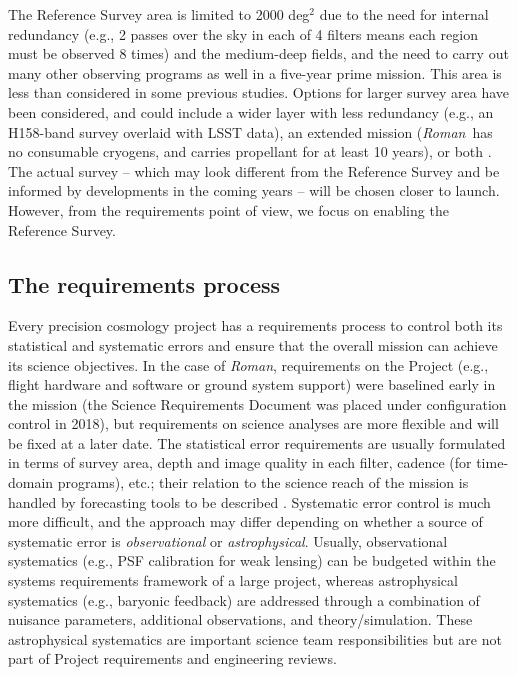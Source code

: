 \documentclass[usenatbib]{mnras}
\newcommand{\wfirst}{{\slshape Roman}}
\newcommand{\changetext}[1]{\textcolor{brown}{#1}}
\begin{document}
The Reference Survey area is limited to 2000 deg$^2$ due to the need for internal redundancy (e.g., 2 passes over the sky in each of 4 filters means each region must be observed 8 times) and the medium-deep fields, and the need to carry out many other observing programs as well in a five-year prime mission. This area is less than considered in some previous studies. Options for larger survey area have been considered, and could include a wider layer with less redundancy (e.g., an H158-band survey overlaid with LSST data), an extended mission (\wfirst\ has no consumable cryogens, and carries propellant for at least 10 years), or both \citep{2019BAAS...51c.418E}. The actual survey -- which may look different from the Reference Survey and be informed by developments in the coming years -- will be chosen closer to launch. However, from the requirements point of view, we focus on enabling the Reference Survey.

\subsection{The requirements process}
\label{ss:req}

Every precision cosmology project has a requirements process to control both its statistical and systematic errors and ensure that the overall mission can achieve its science objectives. In the case of \wfirst, requirements on the Project (e.g., flight hardware and software or ground system support) were baselined early in the mission (the Science Requirements Document was placed under configuration control in 2018), but requirements on science analyses are more flexible and will be fixed at a later date. The statistical error requirements are usually formulated in terms of survey area, depth and image quality in each filter, cadence (for time-domain programs), etc.; their relation to the science reach of the mission is handled by forecasting tools to be described \changetext{\citep{2020arXiv200404702E, 2020arXiv200405271E}}. Systematic error control is much more difficult, and the approach may differ depending on whether a source of systematic error is {\em observational} or {\em astrophysical}. Usually, observational systematics (e.g., PSF calibration for weak lensing) can be budgeted within the systems requirements framework of a large project, whereas astrophysical systematics (e.g., baryonic feedback) are addressed through a combination of nuisance parameters, additional observations, and theory/simulation. These astrophysical systematics are important science team responsibilities but are not part of Project requirements and engineering reviews.
\end{document}
